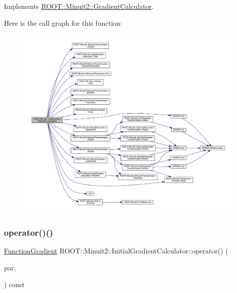 Implements \mbox{\hyperlink{classROOT_1_1Minuit2_1_1GradientCalculator_a1bae913e96ffc9ece28664a5f6f79cb0}{R\+O\+O\+T\+::\+Minuit2\+::\+Gradient\+Calculator}}.

Here is the call graph for this function\+:
\nopagebreak
\begin{figure}[H]
\begin{center}
\leavevmode
\includegraphics[width=350pt]{d3/dcf/classROOT_1_1Minuit2_1_1InitialGradientCalculator_afae3b02315c3ed44cdd94dff4bd53462_cgraph}
\end{center}
\end{figure}
\mbox{\label{classROOT_1_1Minuit2_1_1InitialGradientCalculator_aca07af1a7ff9e8525c0d4d2d3633f9c5}} 
\subsubsection{\texorpdfstring{operator()()}{operator()()}\hspace{0.1cm}{\footnotesize\ttfamily [4/6]}}
{\footnotesize\ttfamily \mbox{\hyperlink{classROOT_1_1Minuit2_1_1FunctionGradient}{Function\+Gradient}} R\+O\+O\+T\+::\+Minuit2\+::\+Initial\+Gradient\+Calculator\+::operator() (\begin{DoxyParamCaption}\item[{const \mbox{\hyperlink{classROOT_1_1Minuit2_1_1MinimumParameters}{Minimum\+Parameters}} \&}]{par,  }\item[{const \mbox{\hyperlink{classROOT_1_1Minuit2_1_1FunctionGradient}{Function\+Gradient}} \&}]{ }\end{DoxyParamCaption}) const\hspace{0.3cm}{\ttfamily [virtual]}}



